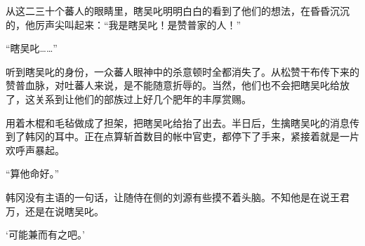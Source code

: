 从这二三十个蕃人的眼睛里，瞎吴叱明明白白的看到了他们的想法，在昏昏沉沉的，他厉声尖叫起来：“我是瞎吴叱！是赞普家的人！”

“瞎吴叱……”

听到瞎吴叱的身份，一众蕃人眼神中的杀意顿时全都消失了。从松赞干布传下来的赞普血脉，对吐蕃人来说，是不能随意折辱的。当然，他们也不会把瞎吴叱给放了，这关系到让他们的部族过上好几个肥年的丰厚赏赐。

用着木棍和毛毡做成了担架，把瞎吴叱给抬了出去。半日后，生擒瞎吴叱的消息传到了韩冈的耳中。正在点算斩首数目的帐中官吏，都停下了手来，紧接着就是一片欢呼声暴起。

“算他命好。”

韩冈没有主语的一句话，让随侍在侧的刘源有些摸不着头脑。不知他是在说王君万，还是在说瞎吴叱。

‘可能兼而有之吧。’

